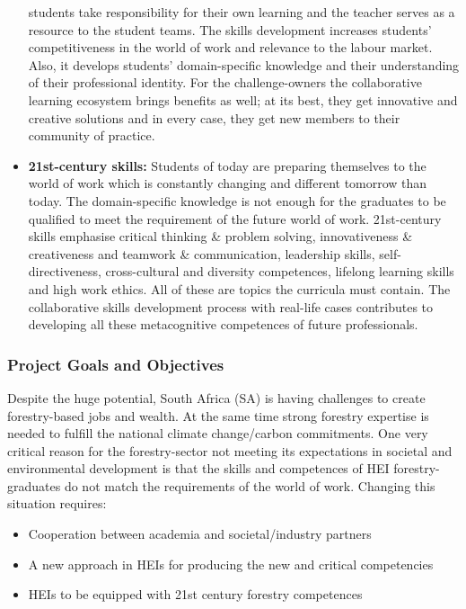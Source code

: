 \documentclass[
  11pt,
]{article}
\begin{document}
\begin{itemize}
  students take responsibility for their own learning and the teacher
  serves as a resource to the student teams. The skills development
  increases students' competitiveness in the world of work and relevance
  to the labour market. Also, it develops students' domain-specific
  knowledge and their understanding of their professional identity. For
  the challenge-owners the collaborative learning ecosystem brings
  benefits as well; at its best, they get innovative and creative
  solutions and in every case, they get new members to their community
  of practice.
\item
  \textbf{21st-century skills:} Students of today are preparing
  themselves to the world of work which is constantly changing and
  different tomorrow than today. The domain-specific knowledge is not
  enough for the graduates to be qualified to meet the requirement of
  the future world of work. 21st-century skills emphasise critical
  thinking \& problem solving, innovativeness \& creativeness and
  teamwork \& communication, leadership skills, self-directiveness,
  cross-cultural and diversity competences, lifelong learning skills and
  high work ethics. All of these are topics the curricula must contain.
  The collaborative skills development process with real-life cases
  contributes to developing all these metacognitive competences of
  future professionals.
\end{itemize}

\hypertarget{project-goals-and-objectives}{%
\subsubsection{Project Goals and
Objectives}\label{project-goals-and-objectives}}

Despite the huge potential, South Africa (SA) is having challenges to
create forestry-based jobs and wealth. At the same time strong forestry
expertise is needed to fulfill the national climate change/carbon
commitments. One very critical reason for the forestry-sector not
meeting its expectations in societal and environmental development is
that the skills and competences of HEI forestry-graduates do not match
the requirements of the world of work. Changing this situation requires:

\begin{itemize}
\item
  Cooperation between academia and societal/industry partners
\item
  A new approach in HEIs for producing the new and critical competencies
\item
  HEIs to be equipped with 21st century forestry competences
\end{itemize}
\end{document}
